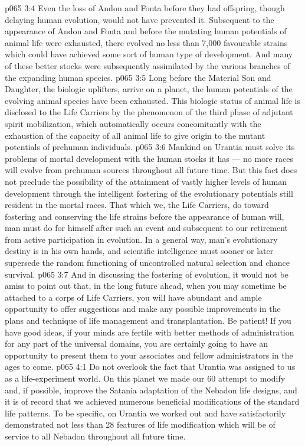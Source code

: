 \vs p065 3:4 \pc Even the loss of Andon and Fonta before they had offspring, though delaying human evolution, would not have prevented it. Subsequent to the appearance of Andon and Fonta and before the mutating human potentials of animal life were exhausted, there evolved no less than 7,000 favourable strains which could have achieved some sort of human type of development. And many of these better stocks were subsequently assimilated by the various branches of the expanding human species.
\vs p065 3:5 Long before the Material Son and Daughter, the biologic uplifters, arrive on a planet, the human potentials of the evolving animal species have been exhausted. This biologic status of animal life is disclosed to the Life Carriers by the phenomenon of the third phase of adjutant spirit mobilization, which automatically occurs concomitantly with the exhaustion of the capacity of all animal life to give origin to the mutant potentials of prehuman individuals.
\vs p065 3:6 \pc Mankind on Urantia must solve its problems of mortal development with the human stocks it has --- no more races will evolve from prehuman sources throughout all future time. But this fact does not preclude the possibility of the attainment of vastly higher levels of human development through the intelligent fostering of the evolutionary potentials still resident in the mortal races. That which we, the Life Carriers, do toward fostering and conserving the life strains before the appearance of human will, man must do for himself after such an event and subsequent to our retirement from active participation in evolution. In a general way, man’s evolutionary destiny is in his own hands, and scientific intelligence must sooner or later supersede the random functioning of uncontrolled natural selection and chance survival.
\vs p065 3:7 And in discussing the fostering of evolution, it would not be amiss to point out that, in the long future ahead, when you may sometime be attached to a corps of Life Carriers, you will have abundant and ample opportunity to offer suggestions and make any possible improvements in the plans and technique of life management and transplantation. Be patient! If you have good ideas, if your minds are fertile with better methods of administration for any part of the universal domains, you are certainly going to have an opportunity to present them to your associates and fellow administrators in the ages to come.
\vs p065 4:1 Do not overlook the fact that Urantia was assigned to us as a life\hyp{}experiment world. On this planet we made our 60 attempt to modify and, if possible, improve the Satania adaptation of the Nebadon life designs, and it is of record that we achieved numerous beneficial modifications of the standard life patterns. To be specific, on Urantia we worked out and have satisfactorily demonstrated not less than 28 features of life modification which will be of service to all Nebadon throughout all future time.
